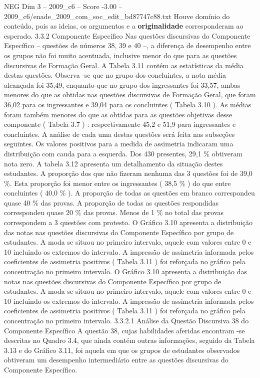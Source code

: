 \begin{textsample}{NEG Dim 3 – 2009\_c6 – Score -3.00 – 2009\_c6/enade\_2009\_com\_soc\_edit\_bd87747c88.txt}
Houve domínio do conteúdo, pois as ideias, os argumentos e a \textbf{originalidade} corresponderam ao esperado. 3.3.2 Componente Específico Nas questões discursivas do Componente Específico – questões de números 38, 39 e 40 –, a diferença de desempenho entre os grupos não foi muito acentuada, inclusive menor do que para as questões discursivas de Formação Geral.
A Tabela 3.11 contém as estatísticas da média destas questões.
Observa -se que no grupo dos concluintes, a nota média alcançada foi 35,49, enquanto que no grupo dos ingressantes foi 33,57, ambas menores do que as obtidas nas questões discursivas de Formação Geral, que foram 36,02 para os ingressantes e 39,04 para os concluintes ( Tabela 3.10 ).
As médias foram também menores do que as obtidas para as questões objetivas desse componente ( Tabela 3.7 ) : respectivamente 45,2 e 51,9 para ingressantes e concluintes.
A análise de cada uma destas questões será feita nas subseções seguintes.
Os valores positivos para a medida de assimetria indicaram uma distribuição com cauda para a esquerda.
Dos 430 presentes, 29,1 \% obtiveram nota zero.
A tabela 3.12 apresenta um detalhamento da situação destes estudantes.
A proporção dos que não fizeram nenhuma das 3 questões foi de 39,0 \%.
Esta proporção foi menor entre os ingressantes ( 38,5 \% ) do que entre concluintes ( 40,0 \% ).
A proporção de todas as questões em branco correspondeu quase 40 \% das provas.
A proporção de todas as questões respondidas correspondeu quase 20 \% das provas.
Menos de 1 \% no total das provas correspondem a 3 questões com protesto.
O Gráfico 3.10 apresenta a distribuição das notas nas questões discursivas do Componente Específico por grupo de estudantes.
A moda se situou no primeiro intervalo, aquele com valores entre 0 e 10 incluindo os extremos do intervalo.
A impressão de assimetria informada pelos coeficientes de assimetria positivos ( Tabela 3.11 ) foi reforçada no gráfico pela concentração no primeiro intervalo.
O Gráfico 3.10 apresenta a distribuição das notas nas questões discursivas do Componente Específico por grupo de estudantes.
A moda se situou no primeiro intervalo, aquele com valores entre 0 e 10 incluindo os extremos do intervalo.
A impressão de assimetria informada pelos coeficientes de assimetria positivos ( Tabela 3.11 ) foi reforçada no gráfico pela concentração no primeiro intervalo. 3.3.2.1 Análise da Questão Discursiva 38 do Componente Específico A questão 38, cujas habilidades aferidas encontram -se descritas no Quadro 3.4, que ainda contém outras informações, seguido da Tabela 3.13 e do Gráfico 3.11, foi aquela em que os grupos de estudantes observados obtiveram um desempenho intermediário entre as questões discursivas do Componente Específico.

\end{textsample}
